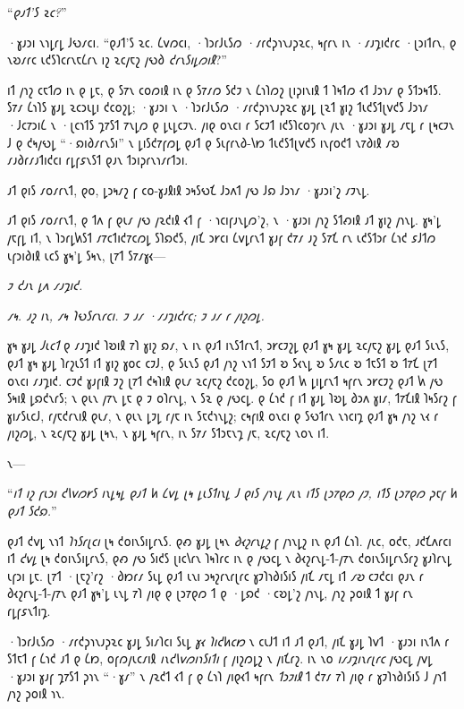 “\emph{𐑞𐑨𐑑'𐑕 𐑷𐑤?}”

·𐑣𐑨𐑮𐑦 𐑯𐑪𐑛𐑩𐑛 𐑓𐑻𐑥𐑤𐑦. “𐑞𐑨𐑑'𐑕 𐑷𐑤. 𐑖𐑫𐑼𐑤𐑦, ·𐑐𐑮𐑩𐑓𐑧𐑕𐑼 ·𐑥𐑩𐑒𐑜𐑪𐑯𐑨𐑜𐑷𐑤, 𐑰𐑝𐑩𐑯 𐑦𐑯 ·𐑥𐑨𐑡𐑦𐑒𐑩𐑤 ·𐑚𐑮𐑦𐑑𐑩𐑯, 𐑞 𐑯𐑹𐑥𐑩𐑤 𐑧𐑒𐑕𐑐𐑤𐑩𐑯𐑱𐑖𐑩𐑯 𐑦𐑟 𐑷𐑤𐑢𐑱𐑟 𐑢𐑻𐑔 \emph{𐑒𐑩𐑯𐑕𐑦𐑛𐑼𐑦𐑙}?”

\later

𐑦𐑑 𐑢𐑪𐑟 𐑤𐑱𐑑𐑼 𐑦𐑯 𐑞 𐑛𐑱, 𐑞 𐑕𐑳𐑯 𐑤𐑴𐑼𐑦𐑙 𐑦𐑯 𐑞 𐑕𐑳𐑥𐑼 𐑕𐑒𐑲 𐑯 𐑖𐑪𐑐𐑼𐑟 𐑚𐑦𐑜𐑦𐑯𐑦𐑙 𐑑 𐑐𐑰𐑑𐑼 𐑬𐑑 𐑓𐑮𐑪𐑥 𐑞 𐑕𐑑𐑮𐑰𐑑𐑕. 𐑕𐑳𐑥 𐑖𐑪𐑐𐑕 𐑣𐑨𐑛 𐑷𐑤𐑮𐑧𐑛𐑦 𐑒𐑤𐑴𐑟𐑛; ·𐑣𐑨𐑮𐑦 𐑯 ·𐑐𐑮𐑩𐑓𐑧𐑕𐑼 ·𐑥𐑩𐑒𐑜𐑪𐑯𐑨𐑜𐑷𐑤 𐑣𐑨𐑛 𐑚𐑷𐑑 𐑣𐑦𐑟 𐑑𐑧𐑒𐑕𐑑𐑚𐑫𐑒𐑕 𐑓𐑮𐑪𐑥 ·𐑓𐑤𐑳𐑮𐑦𐑖 𐑯 ·𐑚𐑤𐑪𐑑𐑕 𐑡𐑳𐑕𐑑 𐑳𐑯𐑛𐑼 𐑞 𐑛𐑧𐑛𐑤𐑲𐑯. 𐑢𐑦𐑞 𐑴𐑯𐑤𐑦 𐑩 𐑕𐑤𐑲𐑑 𐑦𐑒𐑕𐑐𐑤𐑴𐑠𐑩𐑯 𐑢𐑧𐑯 ·𐑣𐑨𐑮𐑦 𐑣𐑨𐑛 𐑥𐑱𐑛 𐑩 𐑚𐑰𐑤𐑲𐑯 𐑓 𐑞 𐑒𐑰𐑢𐑻𐑛 “·𐑸𐑦𐑔𐑥𐑩𐑯𐑕𐑦” 𐑯 𐑛𐑦𐑕𐑒𐑳𐑝𐑼𐑛 𐑞𐑨𐑑 𐑞 𐑕𐑧𐑝𐑩𐑯𐑔-𐑘𐑽 𐑑𐑧𐑒𐑕𐑑𐑚𐑫𐑒𐑕 𐑦𐑯𐑝𐑴𐑒𐑑 𐑯𐑳𐑔𐑦𐑙 𐑥𐑹 𐑥𐑨𐑔𐑩𐑥𐑨𐑑𐑦𐑒𐑤𐑦 𐑩𐑛𐑝𐑭𐑯𐑕𐑑 𐑞𐑨𐑯 𐑑𐑮𐑦𐑜𐑩𐑯𐑪𐑥𐑩𐑑𐑮𐑦.

𐑨𐑑 𐑞𐑦𐑕 𐑥𐑴𐑥𐑩𐑯𐑑, 𐑞𐑴, 𐑛𐑮𐑰𐑥𐑟 𐑝 𐑤𐑴-𐑣𐑨𐑙𐑦𐑙 𐑮𐑰𐑕𐑻𐑗 𐑓𐑮𐑵𐑑 𐑢𐑻 𐑓𐑸 𐑓𐑮𐑪𐑥 ·𐑣𐑨𐑮𐑦'𐑟 𐑥𐑲𐑯𐑛.

𐑨𐑑 𐑞𐑦𐑕 𐑥𐑴𐑥𐑩𐑯𐑑, 𐑞 𐑑𐑵 𐑝 𐑞𐑧𐑥 𐑢𐑻 𐑢𐑷𐑒𐑦𐑙 𐑬𐑑 𐑝 ·𐑪𐑤𐑦𐑝𐑨𐑯𐑛𐑼'𐑟, 𐑯 ·𐑣𐑨𐑮𐑦 𐑢𐑪𐑟 𐑕𐑑𐑺𐑦𐑙 𐑨𐑑 𐑣𐑦𐑟 𐑢𐑪𐑯𐑛. 𐑣𐑰'𐑛 𐑢𐑱𐑝𐑛 𐑦𐑑, 𐑯 𐑐𐑮𐑩𐑛𐑿𐑕𐑑 𐑥𐑳𐑤𐑑𐑦𐑒𐑳𐑤𐑼𐑛 𐑕𐑐𐑸𐑒𐑕, 𐑢𐑦𐑗 𐑮𐑾𐑤𐑦 𐑖𐑫𐑛𐑩𐑯𐑑 𐑣𐑨𐑝 𐑒𐑳𐑥 𐑨𐑟 𐑕𐑳𐑗 𐑩𐑯 𐑧𐑒𐑕𐑑𐑮𐑩 𐑖𐑪𐑒 𐑭𐑓𐑑𐑼 𐑧𐑝𐑮𐑦𐑔𐑦𐑙 𐑧𐑤𐑕 𐑣𐑰'𐑛 𐑕𐑰𐑯, 𐑚𐑳𐑑 𐑕𐑳𐑥𐑣𐑬—

\emph{𐑲 𐑒𐑨𐑯 𐑛𐑵 𐑥𐑨𐑡𐑦𐑒.}

\emph{𐑥𐑰. 𐑨𐑟 𐑦𐑯, 𐑥𐑰 𐑐𐑻𐑕𐑩𐑯𐑩𐑤𐑦. 𐑲 𐑨𐑥 ·𐑥𐑨𐑡𐑦𐑒𐑩𐑤; 𐑲 𐑨𐑥 𐑩 𐑢𐑦𐑟𐑼𐑛.}

𐑣𐑰 𐑣𐑨𐑛 \emph{𐑓𐑧𐑤𐑑} 𐑞 𐑥𐑨𐑡𐑦𐑒 𐑐𐑹𐑦𐑙 𐑳𐑐 𐑣𐑦𐑟 𐑸𐑥, 𐑯 𐑦𐑯 𐑞𐑨𐑑 𐑦𐑯𐑕𐑑𐑩𐑯𐑑, 𐑮𐑾𐑤𐑲𐑟𐑛 𐑞𐑨𐑑 𐑣𐑰 𐑣𐑨𐑛 𐑷𐑤𐑢𐑱𐑟 𐑣𐑨𐑛 𐑞𐑨𐑑 𐑕𐑧𐑯𐑕, 𐑞𐑨𐑑 𐑣𐑰 𐑣𐑨𐑛 𐑐𐑩𐑟𐑧𐑕𐑑 𐑦𐑑 𐑣𐑦𐑟 𐑣𐑴𐑤 𐑤𐑲𐑓, 𐑞 𐑕𐑧𐑯𐑕 𐑞𐑨𐑑 𐑢𐑪𐑟 𐑯𐑪𐑑 𐑕𐑲𐑑 𐑹 𐑕𐑬𐑯𐑛 𐑹 𐑕𐑥𐑧𐑤 𐑹 𐑑𐑱𐑕𐑑 𐑹 𐑑𐑳𐑗 𐑚𐑳𐑑 𐑴𐑯𐑤𐑦 𐑥𐑨𐑡𐑦𐑒. 𐑤𐑲𐑒 𐑣𐑨𐑝𐑦𐑙 𐑲𐑟 𐑚𐑳𐑑 𐑒𐑰𐑐𐑦𐑙 𐑞𐑧𐑥 𐑷𐑤𐑢𐑱𐑟 𐑒𐑤𐑴𐑟𐑛, 𐑕𐑴 𐑞𐑨𐑑 𐑿 𐑛𐑦𐑛𐑩𐑯𐑑 𐑰𐑝𐑩𐑯 𐑮𐑾𐑤𐑲𐑟 𐑞𐑨𐑑 𐑿 𐑢𐑻 𐑕𐑰𐑦𐑙 𐑛𐑸𐑒𐑯𐑩𐑕; 𐑯 𐑞𐑧𐑯 𐑢𐑳𐑯 𐑛𐑱 𐑞 𐑲 𐑴𐑐𐑩𐑯𐑛, 𐑯 𐑕𐑷 𐑞 𐑢𐑻𐑤𐑛. 𐑞 𐑖𐑪𐑒 𐑝 𐑦𐑑 𐑣𐑨𐑛 𐑐𐑹𐑛 𐑔𐑮𐑵 𐑣𐑦𐑥, 𐑑𐑳𐑗𐑦𐑙 𐑐𐑰𐑕𐑩𐑟 𐑝 𐑣𐑦𐑥𐑕𐑧𐑤𐑓, 𐑩𐑢𐑱𐑒𐑩𐑯𐑦𐑙 𐑞𐑧𐑥, 𐑯 𐑞𐑧𐑯 𐑛𐑲𐑛 𐑩𐑢𐑱 𐑦𐑯 𐑕𐑱𐑒𐑪𐑯𐑛𐑟; 𐑤𐑰𐑝𐑦𐑙 𐑴𐑯𐑤𐑦 𐑞 𐑕𐑻𐑑𐑩𐑯 𐑯𐑪𐑤𐑦𐑡 𐑞𐑨𐑑 𐑣𐑰 𐑢𐑪𐑟 𐑯𐑬 𐑩 𐑢𐑦𐑟𐑼𐑛, 𐑯 𐑷𐑤𐑢𐑱𐑟 𐑣𐑨𐑛 𐑚𐑰𐑯, 𐑯 𐑣𐑨𐑛 𐑰𐑝𐑩𐑯, 𐑦𐑯 𐑕𐑳𐑥 𐑕𐑑𐑮𐑱𐑯𐑡 𐑢𐑱, 𐑷𐑤𐑢𐑱𐑟 𐑯𐑴𐑯 𐑦𐑑.

𐑯—

“\emph{𐑦𐑑 𐑦𐑟 𐑝𐑧𐑮𐑦 𐑒𐑘𐑫𐑼𐑾𐑕 𐑦𐑯𐑛𐑰𐑛 𐑞𐑨𐑑 𐑿 𐑖𐑫𐑛 𐑚𐑰 𐑛𐑧𐑕𐑑𐑦𐑯𐑛 𐑓 𐑞𐑦𐑕 𐑢𐑪𐑯𐑛 𐑢𐑧𐑯 𐑦𐑑𐑕 𐑚𐑮𐑳𐑞𐑼 𐑢𐑲, 𐑦𐑑𐑕 𐑚𐑮𐑳𐑞𐑼 𐑜𐑱𐑝 𐑿 𐑞𐑨𐑑 𐑕𐑒𐑸.}”

𐑞𐑨𐑑 𐑒𐑫𐑛 𐑯𐑪𐑑 \emph{𐑐𐑪𐑕𐑩𐑚𐑤𐑦} 𐑚𐑰 𐑒𐑴𐑦𐑯𐑕𐑦𐑛𐑩𐑯𐑕. 𐑞𐑺 𐑣𐑨𐑛 𐑚𐑰𐑯 \emph{𐑔𐑬𐑟𐑩𐑯𐑛𐑟} 𐑝 𐑢𐑪𐑯𐑛𐑟 𐑦𐑯 𐑞𐑨𐑑 𐑖𐑪𐑐. 𐑢𐑧𐑤, 𐑴𐑒𐑱, 𐑨𐑒𐑗𐑵𐑩𐑤𐑦 𐑦𐑑 \emph{𐑒𐑫𐑛} 𐑚𐑰 𐑒𐑴𐑦𐑯𐑕𐑦𐑛𐑩𐑯𐑕, 𐑞𐑺 𐑢𐑻 𐑕𐑦𐑒𐑕 𐑚𐑦𐑤𐑘𐑩𐑯 𐑐𐑰𐑐𐑩𐑤 𐑦𐑯 𐑞 𐑢𐑻𐑤𐑛 𐑯 𐑔𐑬𐑟𐑩𐑯𐑛-𐑑-𐑢𐑳𐑯 𐑒𐑴𐑦𐑯𐑕𐑦𐑛𐑩𐑯𐑕𐑩𐑟 𐑣𐑨𐑐𐑩𐑯𐑛 𐑧𐑝𐑮𐑦 𐑛𐑱. 𐑚𐑳𐑑 ·𐑚𐑱𐑟'𐑩𐑟 ·𐑔𐑽𐑩𐑥 𐑕𐑧𐑛 𐑞𐑨𐑑 𐑧𐑯𐑦 𐑮𐑰𐑟𐑩𐑯𐑩𐑚𐑩𐑤 𐑣𐑲𐑐𐑪𐑔𐑦𐑕𐑦𐑕 𐑢𐑦𐑗 𐑥𐑱𐑛 𐑦𐑑 \emph{𐑥𐑹} 𐑤𐑲𐑒𐑤𐑦 𐑞𐑨𐑯 𐑩 𐑔𐑬𐑟𐑩𐑯𐑛-𐑑-𐑢𐑳𐑯 𐑞𐑨𐑑 𐑣𐑰'𐑛 𐑧𐑯𐑛 𐑳𐑐 𐑢𐑦𐑞 𐑞 𐑚𐑮𐑳𐑞𐑼 𐑑 𐑞 ·𐑛𐑸𐑒 ·𐑤𐑹𐑛'𐑟 𐑢𐑪𐑯𐑛, 𐑢𐑪𐑟 𐑜𐑴𐑦𐑙 𐑑 𐑣𐑨𐑝 𐑩𐑯 𐑩𐑛𐑝𐑭𐑯𐑑𐑦𐑡.

·𐑐𐑮𐑩𐑓𐑧𐑕𐑼 ·𐑥𐑩𐑒𐑜𐑪𐑯𐑨𐑜𐑷𐑤 𐑣𐑨𐑛 𐑕𐑦𐑥𐑐𐑤𐑦 𐑕𐑧𐑛 \emph{𐑣𐑬 𐑐𐑦𐑒𐑿𐑤𐑽} 𐑯 𐑤𐑧𐑓𐑑 𐑦𐑑 𐑨𐑑 𐑞𐑨𐑑, 𐑢𐑦𐑗 𐑣𐑨𐑛 𐑐𐑫𐑑 ·𐑣𐑨𐑮𐑦 𐑦𐑯𐑑𐑵 𐑩 𐑕𐑑𐑱𐑑 𐑝 𐑖𐑪𐑒 𐑨𐑑 𐑞 𐑖𐑽, 𐑴𐑝𐑼𐑢𐑧𐑤𐑥𐑦𐑙 \emph{𐑦𐑯𐑒𐑘𐑫𐑼𐑦𐑪𐑕𐑦𐑑𐑦} 𐑝 𐑢𐑦𐑟𐑼𐑛𐑟 𐑯 𐑢𐑦𐑗𐑩𐑟. 𐑦𐑯 𐑯𐑴 \emph{𐑦𐑥𐑨𐑡𐑦𐑯𐑩𐑚𐑩𐑤} 𐑢𐑻𐑤𐑛 𐑢𐑫𐑛 ·𐑣𐑨𐑮𐑦 𐑣𐑨𐑝 𐑡𐑳𐑕𐑑 𐑜𐑪𐑯 “·𐑣𐑥” 𐑯 𐑢𐑷𐑒𐑑 𐑬𐑑 𐑝 𐑞 𐑖𐑪𐑐 𐑢𐑦𐑞𐑬𐑑 𐑰𐑝𐑩𐑯 \emph{𐑑𐑮𐑲𐑦𐑙} 𐑑 𐑒𐑳𐑥 𐑳𐑐 𐑢𐑦𐑞 𐑩 𐑣𐑲𐑐𐑪𐑔𐑦𐑕𐑦𐑕 𐑓 𐑢𐑪𐑑 𐑢𐑪𐑟 𐑜𐑴𐑦𐑙 𐑪𐑯.

